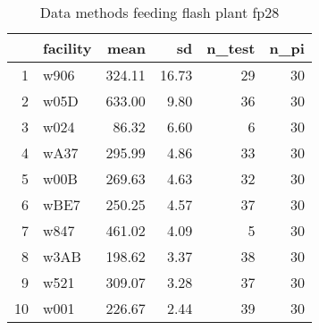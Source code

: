 \begin{table}[H]
\centering
\begin{tabular}{rlrrrr}
  \hline
 & facility & mean & sd & n\_test & n\_pi \\ 
  \hline
1 & w906 & 324.11 & 16.73 &  29 &  30 \\ 
  2 & w05D & 633.00 & 9.80 &  36 &  30 \\ 
  3 & w024 & 86.32 & 6.60 &   6 &  30 \\ 
  4 & wA37 & 295.99 & 4.86 &  33 &  30 \\ 
  5 & w00B & 269.63 & 4.63 &  32 &  30 \\ 
  6 & wBE7 & 250.25 & 4.57 &  37 &  30 \\ 
  7 & w847 & 461.02 & 4.09 &   5 &  30 \\ 
  8 & w3AB & 198.62 & 3.37 &  38 &  30 \\ 
  9 & w521 & 309.07 & 3.28 &  37 &  30 \\ 
  10 & w001 & 226.67 & 2.44 &  39 &  30 \\ 
   \hline
\end{tabular}
\caption{Data methods feeding flash plant fp28} 
\label{tab:well_summaries_fp16}
\end{table}
